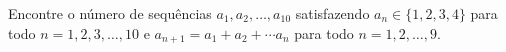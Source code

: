 Encontre o número de sequências $a_1, a_2 , \dots, a_{10}$ satisfazendo $a_n \in \{1, 2, 3, 4\}$ para todo $n = 1, 2, 3, \dots, 10$ e $a_{n+1} = a_1 + a_2 + \cdots a_n$ para todo $n = 1, 2, \dots, 9$.
